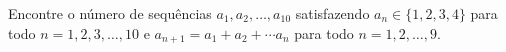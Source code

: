 Encontre o número de sequências $a_1, a_2 , \dots, a_{10}$ satisfazendo $a_n \in \{1, 2, 3, 4\}$ para todo $n = 1, 2, 3, \dots, 10$ e $a_{n+1} = a_1 + a_2 + \cdots a_n$ para todo $n = 1, 2, \dots, 9$.
